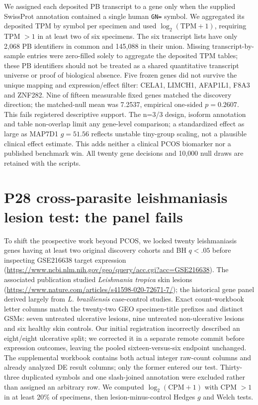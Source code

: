 \documentclass[11pt,a4paper]{article}
\begin{document}
We assigned each deposited PB transcript to a gene only when the supplied SwissProt annotation contained a single human \texttt{GN=} symbol. We aggregated its deposited TPM by symbol per specimen and used $\log_2(\mathrm{TPM}+1)$, requiring TPM $>1$ in at least two of six specimens. The six transcript lists have only 2,068 PB identifiers in common and 145,088 in their union. Missing transcript-by-sample entries were zero-filled solely to aggregate the deposited TPM tables; these PB identifiers should not be treated as a shared quantitative transcript universe or proof of biological absence. Five frozen genes did not survive the unique mapping and expression/effect filter: CELA1, LIMCH1, AFAP1L1, F8A3 and ZNF282. Nine of fifteen measurable fixed genes matched the discovery direction; the matched-null mean was 7.2537, empirical one-sided $p=0.2607$. This fails registered descriptive support. The n=3/3 design, isoform annotation and table non-overlap limit any gene-level comparison; a standardized effect as large as MAP7D1 $g=51.56$ reflects unstable tiny-group scaling, not a plausible clinical effect estimate. This adds neither a clinical PCOS biomarker nor a published benchmark win. All twenty gene decisions and 10,000 null draws are retained with the scripts.

\section{P28 cross-parasite leishmaniasis lesion test: the panel fails}
To shift the prospective work beyond PCOS, we locked twenty leishmaniasis genes having at least two original discovery cohorts and BH $q<.05$ before inspecting GSE216638 target expression (\url{https://www.ncbi.nlm.nih.gov/geo/query/acc.cgi?acc=GSE216638}). The associated publication studied \emph{Leishmania tropica} skin lesions (\url{https://www.nature.com/articles/s41598-020-72671-7/}); the historical gene panel derived largely from \emph{L. braziliensis} case-control studies. Exact count-workbook letter columns match the twenty-two GEO specimen-title prefixes and distinct GSMs: seven untreated ulcerative lesions, nine untreated non-ulcerative lesions and six healthy skin controls. Our initial registration incorrectly described an eight/eight ulcerative split; we corrected it in a separate remote commit before expression outcomes, leaving the pooled sixteen-versus-six endpoint unchanged. The supplemental workbook contains both actual integer raw-count columns and already analyzed DE result columns; only the former entered our test. Thirty-three duplicated symbols and one slash-joined annotation were excluded rather than assigned an arbitrary row. We computed $\log_2(\mathrm{CPM}+1)$ with CPM $>1$ in at least 20\% of specimens, then lesion-minus-control Hedges $g$ and Welch tests.
\end{document}
